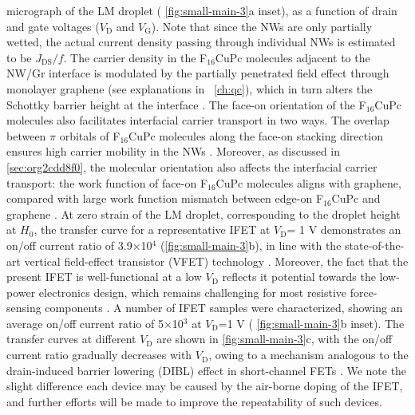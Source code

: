 micrograph of the LM droplet ( \autoref{fig:small-main-3}a inset), as
a function of drain and gate voltages (\(V_{\mathrm{D}}\) and
\(V_{\mathrm{G}}\)). Note that since the NWs are only partially
wetted, the actual current density passing through individual NWs is
estimated to be \(J_{\mathrm{DS}}/f\). The carrier density in the
F\(_{\text{16}}\)CuPc molecules adjacent to the NW/Gr interface is
modulated by the partially penetrated field effect through monolayer
graphene (see explanations in ~\autoref{ch:qc}), which in turn alters
the Schottky barrier height at the interface
\cite{Yang_2012_Barristor}.
%
The face-on orientation of the F\(_{\text{16}}\)CuPc molecules also
facilitates interfacial carrier transport in two ways. The overlap
between \(\pi\) orbitals of F\(_{\text{16}}\)CuPc molecules along the
face-on stacking direction ensures high carrier mobility in the NWs
\cite{Bao_1998_FCuPC}.
%
Moreover, as discussed in \autoref{sec:org2cdd8f0}, the molecular
orientation also affects the interfacial carrier transport: the work
function of face-on F\(_{\text{16}}\)CuPc molecules aligns with
graphene, compared with large work function mismatch between edge-on
F\(_{\text{16}}\)CuPc and graphene
\cite{Mao_2010_F16_level_orien,Ren_2011_DFT_CuPc_epi_gr}.
%
At zero strain of the LM droplet,  corresponding to the droplet height at \(H_{0}\),
the transfer curve for a representative IFET at \(V_{\mathrm{D}}\)= 1
V demonstrates an on/off current ratio of
3.9\(\times\)10\(^{\text{4}}\) (\autoref{fig:small-main-3}b), in line
with the state-of-the-art vertical field-effect transistor (VFET)
technology
\cite{Yang_2012_Barristor,Shih_2015_PartiallyScreened,Sun_2017_COF_VFET,Ben_Sasson_2014_fet_rev}.
%
Moreover,
the fact that the present IFET is well-functional at a low
\(V_{\mathrm{D}}\) reflects it potential towards the low-power
electronics design, which remains challenging for most resistive
force-sensing components \cite{Pan_2014_pressure,Pang_2012_gauge}. A
number of IFET samples were characterized, showing an average on/off
current ratio of 5\(\times\)10\(^{\text{3}}\) at \(V_{\mathrm{D}}\)=1
V ( \autoref{fig:small-main-3}b inset). The transfer curves at
different \(V_{\mathrm{D}}\) are shown in \autoref{fig:small-main-3}c,
with the on/off current ratio gradually decreases with
\(V_{\mathrm{D}}\), owing to a mechanism analogous to the
drain-induced barrier lowering (DIBL) effect in short-channel FETs
\cite{Lundstrom_2003_moore}. We note the slight difference each device
may be caused by the air-borne doping of the IFET, and further efforts
will be made to improve the repeatability of such devices.
